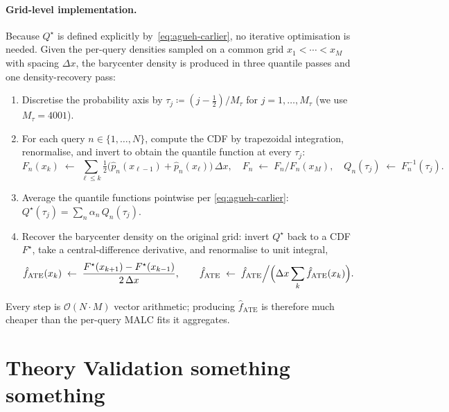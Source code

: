 \documentclass[11pt]{article}
\begin{document}
\paragraph{Grid-level implementation.}
Because $Q^{\star}$ is defined explicitly by~\eqref{eq:agueh-carlier},
no iterative optimisation is needed. Given the per-query densities
sampled on a common grid $x_{1} < \cdots < x_{M}$ with spacing
$\Delta x$, the barycenter density is produced in three quantile
passes and one density-recovery pass:
\begin{enumerate}[label=\arabic*., leftmargin=1.8em]
  \item Discretise the probability axis by $\tau_{j} \coloneqq
    (j - \tfrac{1}{2}) / M_{\tau}$ for $j = 1, \dots, M_{\tau}$
    (we use $M_{\tau} = 4001$).
  \item For each query $n \in \{1, \dots, N\}$, compute the CDF by
    trapezoidal integration, renormalise, and invert to obtain the
    quantile function at every $\tau_{j}$:
    \[
      F_{n}(x_{k}) \;\gets\;
        \sum_{\ell \leq k}
        \tfrac{1}{2}\bigl(\hat{p}_{n}(x_{\ell - 1})
        + \hat{p}_{n}(x_{\ell})\bigr)\, \Delta x,
      \quad
      F_{n} \;\gets\; F_{n} / F_{n}(x_{M}),
      \quad
      Q_{n}(\tau_{j}) \;\gets\; F_{n}^{-1}(\tau_{j}).
    \]
  \item Average the quantile functions pointwise per
    \eqref{eq:agueh-carlier}: $Q^{\star}(\tau_{j}) = \sum_{n}
    \alpha_{n}\, Q_{n}(\tau_{j})$.
  \item Recover the barycenter density on the original grid: invert
    $Q^{\star}$ back to a CDF $F^{\star}$, take a central-difference
    derivative, and renormalise to unit integral,
    \[
      \hat{f}_{\mathrm{ATE}}(x_{k}) \;\gets\;
        \frac{F^{\star}(x_{k+1}) - F^{\star}(x_{k-1})}{2\, \Delta x},
      \qquad
      \hat{f}_{\mathrm{ATE}} \;\gets\; \hat{f}_{\mathrm{ATE}} \Big/
        \Bigl(\Delta x \sum_{k} \hat{f}_{\mathrm{ATE}}(x_{k})\Bigr).
    \]
\end{enumerate}
Every step is $\mathcal{O}(N \cdot M)$ vector arithmetic; producing
$\hat{f}_{\mathrm{ATE}}$ is therefore much cheaper than the per-query
MALC fits it aggregates.




\section{Theory Validation something something}
\label{app:theoryval}
\end{document}
